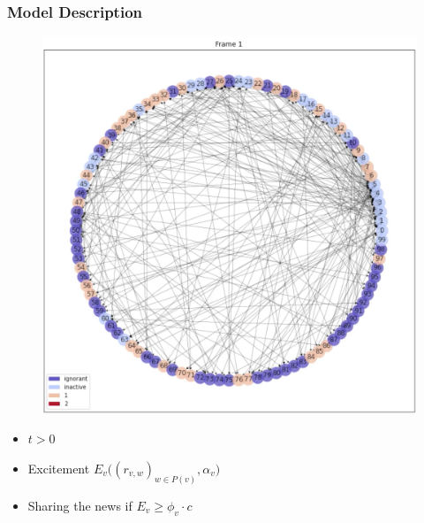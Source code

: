 \documentclass{beamer}
\begin{document}
\begin{frame}
\frametitle{Model Description}

\begin{center}
\begin{figure}
\includegraphics[scale=0.2]{images/frame1.png}
\end{figure}
\end{center}

\begin{itemize}
\item<1-> $t > 0$
\item<2-> Excitement $E_v\Big((r_{v,w})_{w \in P(v)}, \alpha_v \Big)$
\item<3-> Sharing the news if $E_v \geq  \phi_v \cdot c$
\end{itemize}

\end{frame}
\end{document}
